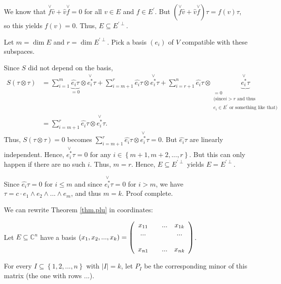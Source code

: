 \documentclass
[numbers=enddot,12pt,final,onecolumn,german,notitlepage]{scrartcl}%
\theoremstyle{definition}
\begin{document}
We know that $\overset{\vee}{f}\widehat{v}+\widehat{v}\overset{\vee}{f}=0$ for
all $v\in E$ and $f\in E^{\prime}$. But $\left(  \overset{\vee}{f}%
\widehat{v}+\widehat{v}\overset{\vee}{f}\right)  \tau=f\left(  v\right)  \tau
$, so this yields $f\left(  v\right)  =0$. Thus, $E\subseteq E^{\prime\perp}$.

Let $m=\dim E$ and $r=\dim E^{\prime\perp}$. Pick a basis $\left(
e_{i}\right)  $ of $V$ compatible with these subspaces.

Since $S$ did not depend on the basis,%
\begin{align*}
S\left(  \tau\otimes\tau\right)   &  =\sum\limits_{i=1}^{m}%
\underbrace{\widehat{e_{i}}\tau}_{=0}\otimes\overset{\vee}{e_{i}^{\ast}}%
\tau+\sum\limits_{i=m+1}^{r}\widehat{e_{i}}\tau\otimes\overset{\vee
}{e_{i}^{\ast}}\tau+\sum\limits_{i=r+1}^{n}\widehat{e_{i}}\tau\otimes
\underbrace{\overset{\vee}{e_{i}^{\ast}}\tau}_{\substack{=0\\\text{(since
}i>r\text{ and thus }\\e_{i}\in E^{\prime}\text{ or something like that)}}}\\
&  =\sum\limits_{i=m+1}^{r}\widehat{e_{i}}\tau\otimes\overset{\vee
}{e_{i}^{\ast}}\tau.
\end{align*}
Thus, $S\left(  \tau\otimes\tau\right)  =0$ becomes $\sum\limits_{i=m+1}%
^{r}\widehat{e_{i}}\tau\otimes\overset{\vee}{e_{i}^{\ast}}\tau=0$. But
$\widehat{e_{i}}\tau$ are linearly independent. Hence, $\overset{\vee
}{e_{i}^{\ast}}\tau=0$ for any $i\in\left\{  m+1,m+2,...,r\right\}  $. But
this can only happen if there are no such $i$. Thus, $m=r$. Hence, $E\subseteq
E^{\prime\perp}$ yields $E=E^{\prime\perp}$.

Since $\widehat{e_{i}}\tau=0$ for $i\leq m$ and since $\overset{\vee
}{e_{i}^{\ast}}\tau=0$ for $i>m$, we have $\tau=c\cdot e_{1}\wedge e_{2}%
\wedge...\wedge e_{m}$, and thus $m=k$. Proof complete.

We can rewrite Theorem \ref{thm.plu} in coordinates:

Let $E\subseteq\mathbb{C}^{n}$ have a basis $\left(  x_{1},x_{2}%
,...,x_{k}\right)  =\left(
\begin{array}
[c]{cccc}%
x_{11} &  & ... & x_{1k}\\
... &  &  & ...\\
&  &  & \\
x_{n1} &  & ... & x_{nk}%
\end{array}
\right)  $.

For every $I\subseteq\left\{  1,2,...,n\right\}  $ with $\left\vert
I\right\vert =k$, let $P_{I}$ be the corresponding minor of this matrix (the
one with rows ...).
\end{document}
